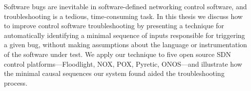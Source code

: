 Software bugs are inevitable in software-defined networking control software,
and troubleshooting
is a tedious, time-consuming task. In this thesis we discuss how to improve
control software troubleshooting by presenting a technique
for automatically identifying
a minimal sequence of inputs responsible for triggering a given bug, without
making assumptions about the language or instrumentation of the software under
test. We apply our technique to five open source SDN control
platforms---Floodlight, NOX, POX, Pyretic, ONOS---and
illustrate how the minimal causal sequences our system found aided the
troubleshooting process.
